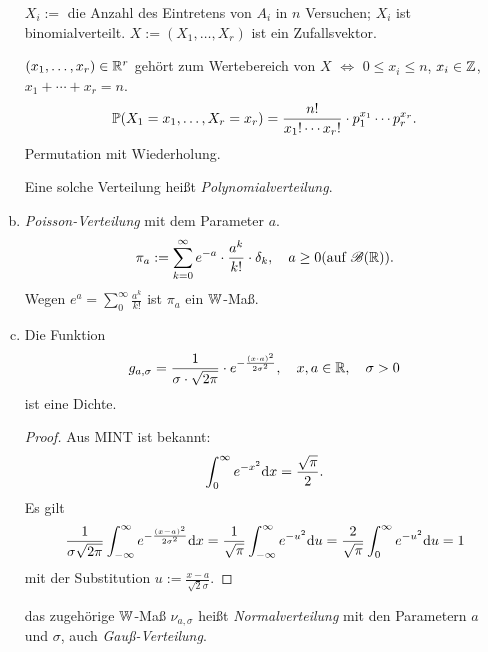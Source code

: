 \begin{exmp}
\begin{enumerate}[(a)]
    $X_i :=$ die Anzahl des Eintretens von $A_i$ in $n$ Versuchen; $X_i$ ist
    binomialverteilt. $X := (X_1, \ldots, X_r)$ ist ein Zufallsvektor.

    $(x_1, \ldots, x_r) \in \mathbb{R}^r$ gehört zum Wertebereich von $X$
    $\Leftrightarrow$ $0 \le x_i \le n$, $x_i \in \mathbb{Z}$, $x_1 + \cdots + x_r
    = n$.
    \[ \mathbb{P}( X_1 = x_1, \ldots, X_r = x_r) = \frac{n!}{x_1! \cdots x_r!} \cdot
      p_1^{x_1} \cdots p_r^{x_r}. \]
    Permutation mit Wiederholung.

    Eine solche Verteilung heißt \emph{Polynomialverteilung}.
  \item \emph{Poisson-Verteilung} mit dem Parameter $a$.
    \[ \pi_a := \sum_{k=0}^\infty e^{-a} \cdot \frac{a^k}{k!} \cdot \delta_k,
      \quad a \ge 0 (\text{auf } \mathscr{B}(\mathbb{R})). \]
    Wegen $e^a = \sum_0^\infty \frac{a^k}{k!}$ ist $\pi_a$ ein $\mathbb{W}$-Maß.
  \item Die Funktion
    \[ g_{a,\sigma} = \frac{1}{\sigma \cdot \sqrt{2 \pi}} \cdot
      e^{-\frac{(x \cdot a)^2}{2 \sigma^2}}, \quad x, a \in \mathbb{R}, \quad \sigma >
      0 \]
    ist eine Dichte.
    \begin{proof}
      Aus MINT ist bekannt:
      \[ \int_0^\infty e^{-x^2} \mathrm{d} x = \frac{\sqrt{\pi}}{2}. \]
      Es gilt
      \begin{align*}
        \frac{1}{\sigma \sqrt{2 \pi}} \int_{-\infty}^\infty e^{- \frac{(x-a)^2}{2 \sigma^2}} \mathrm{d} x
        = \frac{1}{\sqrt{\pi}} \int_{-\infty}^\infty e^{-u^2} \mathrm{d} u = \frac{2}{\sqrt{\pi}} \int_0^\infty e^{-u^2} \mathrm{d} u = 1
      \end{align*}
      mit der Substitution $u := \frac{x-a}{\sqrt{2} \sigma}$.
    \end{proof}
    das zugehörige $\mathbb{W}$-Maß $\nu_{a,\sigma}$ heißt \emph{Normalverteilung} mit
    den Parametern $a$ und $\sigma$, auch \emph{Gauß-Verteilung}.


\end{enumerate}
\end{exmp}
